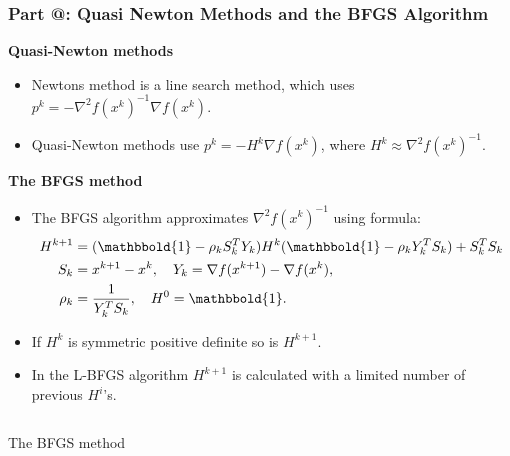 \documentclass[9pt]{beamer}
\makeatletter
\newcommand*{\rom}[1]{\expandafter\@slowromancap\romannumeral #1@}
\makeatother
\begin{document}
\begin{frame}
\frametitle{\textbf{ Part \rom{2}:} Quasi Newton Methods and the BFGS Algorithm}
\textbf{Quasi-Newton methods}
\begin{itemize}
\item{Newtons method is a line search method, which uses $p^k=-\nabla^2f(x^k)^{-1}\nabla f(x^k)$.}
\item{Quasi-Newton methods use $p^k=-H^k\nabla f(x^k)$, where $H^k\approx \nabla^2f(x^k)^{-1}$.}
\end{itemize}
\textbf{The BFGS method}
\begin{itemize}
\item{The BFGS algorithm approximates $\nabla^2f(x^k)^{-1}$ using formula:{\small
\begin{align*}
H^{k+1} &= (\mathbbold{1}-\rho_kS_k^T Y_k)H^k(\mathbbold{1} -\rho_kY_k^T S_k) + S_k^T S_k\\
S_k &= x^{k+1}-x^{k},
\quad Y_k = \nabla f(x^{k+1})-\nabla f(x^{k}),\\
\rho_k &= \frac{1}{Y_k^T S_k},\quad H^0=\mathbbold{1}.
\end{align*}
}
}
\item{If $H^k$ is symmetric positive definite so is $H^{k+1}$. }
\item{In the L-BFGS algorithm $H^{k+1}$ is calculated with a limited number of previous $H^i$'s.}
\end{itemize}
\begin{columns}
{\small
\begin{algorithm}[H] 
\caption{The BFGS method\label{SEQ_ALG}}
\end{algorithm}
}
\end{columns}
\end{frame}
\end{document}
